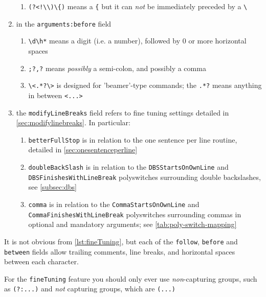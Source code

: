 \begin{enumerate}
\begin{enumerate}
         \item \lstinline^(?<!\\)\{)^ means a \lstinline^{^ but it can \emph{not} be immediately preceded by a \lstinline!\!
        \end{enumerate}
  \item in the \texttt{arguments:before} field
        \begin{enumerate}
         \item \lstinline^\d\h*^ means a digit (i.e. a number), followed by 0 or more horizontal spaces
         \item \lstinline^;?,?^ means \emph{possibly} a semi-colon, and possibly a comma
         \item \lstinline^\<.*?\>^ is designed for 'beamer'-type commands; the
               \lstinline^.*?^ means anything in between \lstinline^<...>^
        \end{enumerate}
  \item the \texttt{modifyLineBreaks} field refers to fine tuning settings detailed in
      \vref{sec:modifylinebreaks}. In particular:
        \begin{enumerate}
         \item \texttt{betterFullStop} is in relation to the one sentence per line routine, detailed in
               \vref{sec:onesentenceperline}
         \item \texttt{doubleBackSlash} is in relation to the \texttt{DBSStartsOnOwnLine} and
               \texttt{DBSFinishesWithLineBreak} polyswitches surrounding double backslashes, see
               \vref{subsec:dbs}
         \item \texttt{comma} is in relation to the \texttt{CommaStartsOnOwnLine} and
               \texttt{CommaFinishesWithLineBreak} polyswitches surrounding commas in optional and
               mandatory arguments; see \vref{tab:poly-switch-mapping}
        \end{enumerate}
 \end{enumerate}

 It is not obvious from \cref{lst:fineTuning}, but each of the \texttt{follow},
 \texttt{before} and \texttt{between} fields allow trailing comments, line breaks, and
 horizontal spaces between each character.

 \begin{warning}
  For the \texttt{fineTuning} feature you should only ever use \emph{non}-capturing
  groups, such as \lstinline!(?:...)! and \emph{not} capturing groups, which are
  \lstinline!(...)!
 \end{warning}

